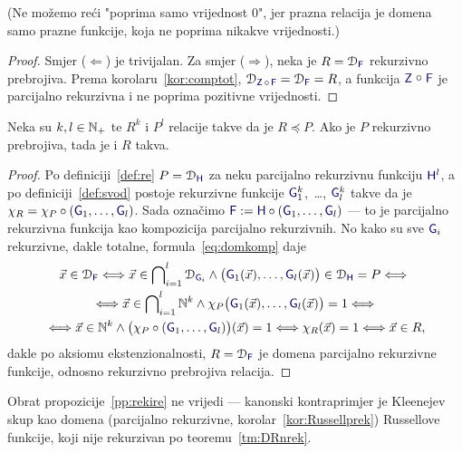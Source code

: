 (Ne možemo reći "poprima samo vrijednost $0$", jer prazna relacija je domena samo prazne funkcije, koja ne poprima nikakve vrijednosti.)

\begin{proof}
    Smjer ($\Leftarrow$) je trivijalan. Za smjer ($\Rightarrow$), neka je $R=\dom{\f F}$ rekurzivno prebrojiva. Prema korolaru~\ref{kor:comptot}, $\dom{\f Z\,\circ\,\f F}=\dom{\f F}=R$, a funkcija $\f Z\mathrel{\raisebox{1pt}{$\circ$}}\f F$ je parcijalno rekurzivna i ne poprima pozitivne vrijednosti.
\end{proof}

\begin{lema}[{name=[svedivost čuva rekurzivnu prebrojivost]}]\label{lm:re<re}
Neka su $k,l\in{\mathbb N}_+$ te $R^k$ i $P^l$ relacije takve da je $R\preceq P$. Ako je $P$ rekurzivno prebrojiva, tada je i $R$ takva.
\end{lema}
\begin{proof}
    Po definiciji~\ref{def:re} $P=\dom{\f H}$ za neku parcijalno rekurzivnu funkciju $\f H^l$, a po definiciji~\ref{def:svod} postoje rekurzivne funkcije $\f G_1^k$,~\ldots, $\f G_l^k$ takve da je $\chi_R=\chi_P\circ(\f G_1,\dotsc,\f G_l)$. Sada označimo $\f F:=\f H\circ(\f G_1,\dotsc,\f G_l)$ --- to je parcijalno rekurzivna funkcija kao kompozicija parcijalno rekurzivnih. No kako su sve $\f G_i$ rekurzivne, dakle totalne, formula~\eqref{eq:domkomp} daje
\begin{multline}
    \vec x\in\dom{\f F}\Longleftrightarrow
    \vec x\in\bigcap\nolimits_{i=1}^l\dom{\f G_i}\land
    \bigl(\f G_1(\vec x),\dotsc,\f G_l(\vec x)\bigr)\in\dom{\f H}=P\Longleftrightarrow{}\\
    {}\Longleftrightarrow\vec x\in\bigcap\nolimits_{i=1}^l\N^k\land\chi_P\bigl(\f G_1(\vec x),\dotsc,\f G_l(\vec x)\bigr)=1\Longleftrightarrow{}\\
    {}\Longleftrightarrow\vec x\in\N^k\land\bigl(\chi_P\circ(\f G_1,\dotsc,\f G_l)\bigr)(\vec x)=1\Longleftrightarrow\chi_R(\vec x)=1\Longleftrightarrow\vec x\in R\text,
\end{multline}
dakle po aksiomu ekstenzionalnosti, $R=\dom{\f F}$ je domena parcijalno rekurzivne funkcije, odnosno rekurzivno prebrojiva relacija.
\end{proof}

Obrat propozicije~\ref{pp:rekire} ne vrijedi --- kanonski kontraprimjer je Kleenejev skup kao domena (parcijalno rekurzivne, korolar~\ref{kor:Russellprek}) Russellove funkcije, koji nije rekurzivan po teoremu~\ref{tm:DRnrek}.

